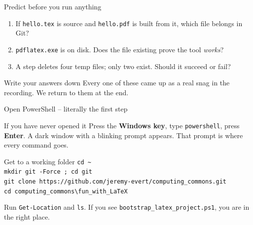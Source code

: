 \documentclass[aspectratio=169,11pt]{beamer}
\begin{document}
\begin{frame}{Predict before you run anything}
\begin{enumerate}
  \item If \texttt{hello.tex} is source and \texttt{hello.pdf} is built from
    it, which file belongs in Git?
  \item \texttt{pdflatex.exe} is on disk. Does the file existing prove the
    tool \emph{works}?
  \item A step deletes four temp files; only two exist. Should it succeed or
    fail?
\end{enumerate}
\vspace{0.4cm}
\begin{alertblock}{Write your answers down}
Every one of these came up as a real snag in the recording. We return to them
at the end.
\end{alertblock}
\end{frame}

\begin{frame}{Open PowerShell -- literally the first step}
\begin{block}{If you have never opened it}
Press the \textbf{Windows key}, type \texttt{powershell}, press
\textbf{Enter}. A dark window with a blinking prompt appears. That prompt is
where every command goes.
\end{block}
\begin{exampleblock}{Get to a working folder}
\texttt{cd \textasciitilde} \\
\texttt{mkdir git -Force ; cd git} \\
\texttt{git clone https://github.com/jeremy-evert/computing\_commons.git} \\
\texttt{cd computing\_commons\textbackslash fun\_with\_LaTeX}
\end{exampleblock}
Run \texttt{Get-Location} and \texttt{ls}. If you see
\texttt{bootstrap\_latex\_project.ps1}, you are in the right place.
\end{frame}
\end{document}
